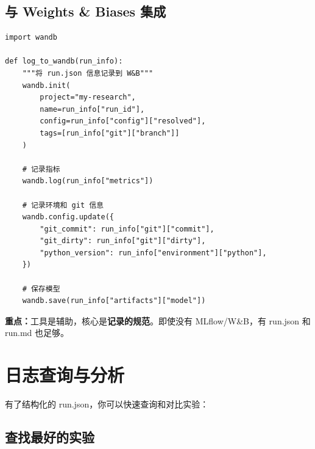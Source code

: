 \subsection{与 Weights \& Biases 集成}

\begin{verbatim}
import wandb

def log_to_wandb(run_info):
    """将 run.json 信息记录到 W&B"""
    wandb.init(
        project="my-research",
        name=run_info["run_id"],
        config=run_info["config"]["resolved"],
        tags=[run_info["git"]["branch"]]
    )

    # 记录指标
    wandb.log(run_info["metrics"])

    # 记录环境和 git 信息
    wandb.config.update({
        "git_commit": run_info["git"]["commit"],
        "git_dirty": run_info["git"]["dirty"],
        "python_version": run_info["environment"]["python"],
    })

    # 保存模型
    wandb.save(run_info["artifacts"]["model"])
\end{verbatim}

\textbf{重点：}工具是辅助，核心是\textbf{记录的规范}。即使没有 MLflow/W\&B，有 run.json 和 run.md 也足够。

\section{日志查询与分析}

有了结构化的 run.json，你可以快速查询和对比实验：

\subsection{查找最好的实验}

